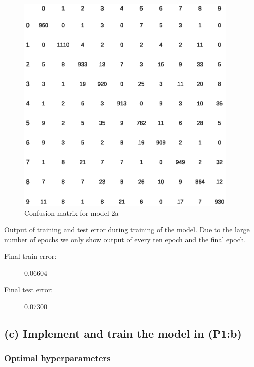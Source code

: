 \documentclass{article}
\begin{document}
\begin{figure}[H]
  \centering
  \includegraphics[width=0.95\textwidth]{model_2a_confusion_matrix.eps}
  \caption{Confusion matrix for model 2a}
  \label{fig:conf_2a}
\end{figure}

Output of training and test error during training of the model. Due to the large
number of epochs we only show output of every ten epoch and the final epoch.



\begin{description}
\item[Final train error:] $0.06604$
\item[Final test error:] $0.07300$
\end{description}

\newpage

\subsection{(c) Implement and train the model in (P1:b)}

\subsubsection{Optimal hyperparameters}
\end{document}
